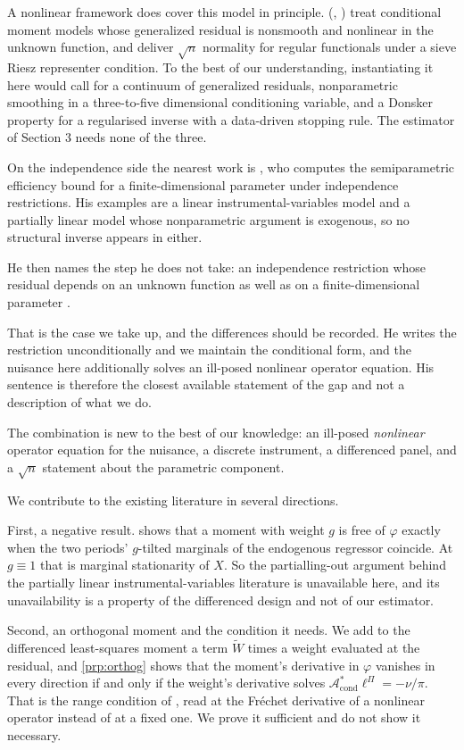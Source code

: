 \documentclass[
  12pt]{article}
\newcommand{\1}[1]{\mathds{1}\left[#1\right]}
\theoremstyle{plain}
\theoremstyle{definition}
\theoremstyle{definition}
\theoremstyle{remark}
\begin{document}
A nonlinear framework does cover this model in principle.
\citeauthor{chen2012} (\citeyear{chen2012}, \citeyear{chen2012b}) treat
conditional moment models whose generalized residual is nonsmooth and
nonlinear in the unknown function, and deliver \(\sqrt n\) normality for
regular functionals under a sieve Riesz representer condition. To the
best of our understanding, instantiating it here would call for a
continuum of generalized residuals, nonparametric smoothing in a
three-to-five dimensional conditioning variable, and a Donsker property
for a regularised inverse with a data-driven stopping rule. The
estimator of Section 3 needs none of the three.

On the independence side the nearest work is \citet{poirier2017}, who
computes the semiparametric efficiency bound for a finite-dimensional
parameter under independence restrictions. His examples are a linear
instrumental-variables model and a partially linear model whose
nonparametric argument is exogenous, so no structural inverse appears in
either.

He then names the step he does not take: an independence restriction
whose residual depends on an unknown function as well as on a
finite-dimensional parameter \citep[\S5]{poirier2017}.

That is the case we take up, and the differences should be recorded. He
writes the restriction unconditionally and we maintain the conditional
form, and the nuisance here additionally solves an ill-posed nonlinear
operator equation. His sentence is therefore the closest available
statement of the gap and not a description of what we do.

The combination is new to the best of our knowledge: an ill-posed
\emph{nonlinear} operator equation for the nuisance, a discrete
instrument, a differenced panel, and a \(\sqrt n\) statement about the
parametric component.

We contribute to the existing literature in several directions.

First, a negative result.  shows that a moment with
weight \(g\) is free of \(\varphi\) exactly when the two periods'
\(g\)-tilted marginals of the endogenous regressor coincide. At
\(g\equiv1\) that is marginal stationarity of \(X\). So the
partialling-out argument behind the partially linear
instrumental-variables literature is unavailable here, and its
unavailability is a property of the differenced design and not of our
estimator.

Second, an orthogonal moment and the condition it needs. We add to the
differenced least-squares moment a term \(\widetilde W\) times a weight
evaluated at the residual, and \cref{prp:orthog} shows that the moment's
derivative in \(\varphi\) vanishes in every direction if and only if the
weight's derivative solves
\(\mathcal A^\ast_{\mathrm{cond}}\ell^\Pi=-\nu/\pi\). That is the range
condition of \citet{severini2006}, read at the Fréchet derivative of a
nonlinear operator instead of at a fixed one. We prove it sufficient and
do not show it necessary.
\end{document}
